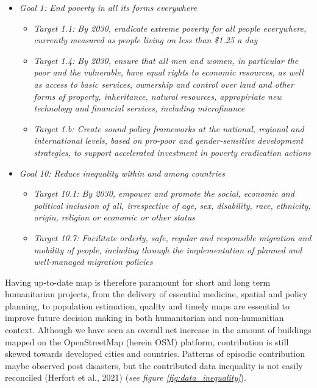 \documentclass[11pt, a4paper, twoside]{report}
\begin{document}
\begin{itemize}
  \item \textit{Goal 1: End poverty in all its forms everywhere}
  \begin{itemize}
    \item \textit{Target 1.1: By 2030, eradicate extreme poverty for all people everywhere, currently measured as people living on less than \$1.25 a day}
    \item \textit{Target 1.4: By 2030, ensure that all men and women, in particular the poor and the vulnerable, have equal rights to economic resources, as well as access to basic services, ownership and control over land and other forms of property, inheritance, natural resources, appropiriate new technology and financial services, including microfinance}
    \item \textit{Target 1.b: Create sound policy frameworks at the national, regional and international levels, based on pro-poor and gender-sensitive development strategies, to support accelerated investment in poverty eradication actions}
  \end{itemize}
  \item \textit{Goal 10: Reduce inequality within and among countries}
  \begin{itemize}
    \item \textit{Target 10.1: By 2030, empower and promote the social, economic and political inclusion of all, irrespective of age, sex, disability, race, ethnicity, origin, religion or economic or other status}
    \item \textit{Target 10.7: Facilitate orderly, safe, regular and responsible migration and mobility of people, including through the implementation of planned and well-managed migration policies}
  \end{itemize}
\end{itemize}

Having up-to-date map is therefore paramount for short and long term humanitarian projects, from the delivery of essential medicine, spatial and policy planning, to population estimation, quality and timely maps are essential to improve future decision making in both humanitarian and non-humanitian context. Although we have seen an overall net increase in the amount of buildings mapped on the OpenStreetMap (herein OSM) platform, contribution is still skewed towards developed cities and countries. Patterns of episodic contribution maybe observed post disasters, but the contributed data inequality is not easily reconciled (Herfort et al., 2021) (\textit{see figure \ref{fig:data_inequality}}).\\\par
\end{document}
